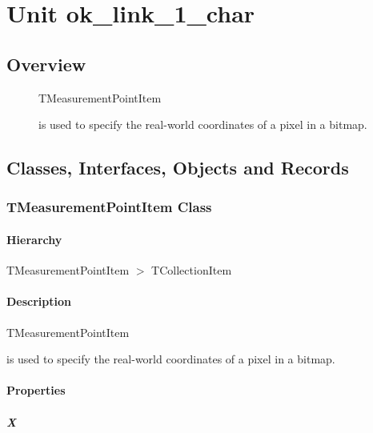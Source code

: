 \documentclass{report}
\begin{document}
\newlength{\tmplength}
\chapter{Unit ok{\_}link{\_}1{\_}char}
\section{Overview}
\begin{description}
\item[\texttt{\begin{ttfamily}TMeasurementPointItem\end{ttfamily} Class}]\begin{ttfamily}TMeasurementPointItem\end{ttfamily} is used to specify the real{-}world coordinates of a pixel in a bitmap.
\end{description}
\section{Classes, Interfaces, Objects and Records}
\subsection*{TMeasurementPointItem Class}
\subsubsection*{\large{\textbf{Hierarchy}}\normalsize\hspace{1ex}\hfill}
TMeasurementPointItem {$>$} TCollectionItem
\subsubsection*{\large{\textbf{Description}}\normalsize\hspace{1ex}\hfill}
\begin{ttfamily}TMeasurementPointItem\end{ttfamily} is used to specify the real{-}world coordinates of a pixel in a bitmap.\subsubsection*{\large{\textbf{Properties}}\normalsize\hspace{1ex}\hfill}
\paragraph*{X}\hspace*{\fill}
\end{document}

